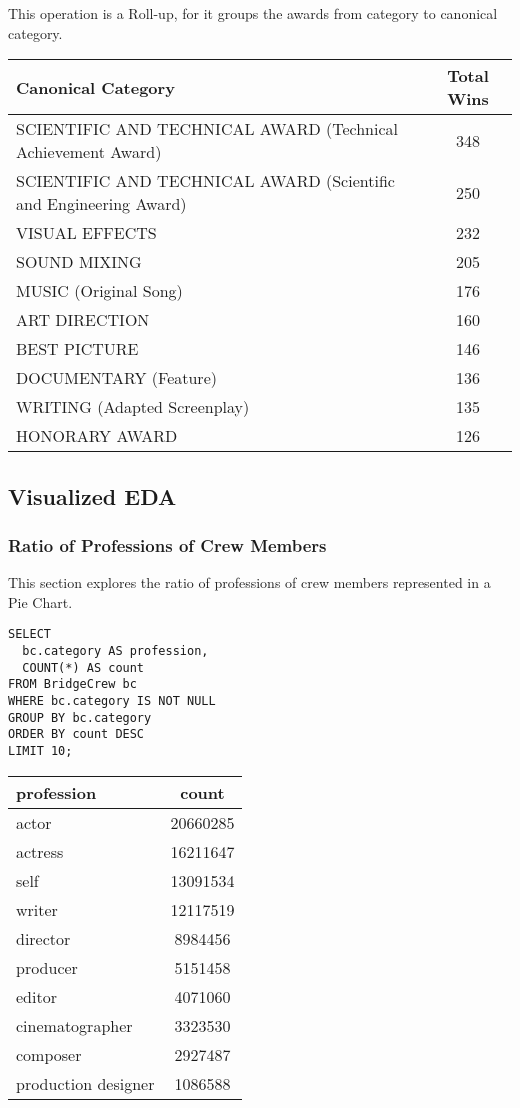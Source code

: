 \documentclass[sigconf, pbalance]{acmart}
\begin{document}
This operation is a Roll-up, for it groups the awards from category to canonical category.

\begin{center}
\begin{tabular}{|p{5cm}|c|}
\hline
\textbf{Canonical Category} & \textbf{Total Wins} \\
\hline
SCIENTIFIC AND TECHNICAL AWARD (Technical Achievement Award) & 348 \\
SCIENTIFIC AND TECHNICAL AWARD (Scientific and Engineering Award) & 250 \\
VISUAL EFFECTS & 232 \\
SOUND MIXING & 205 \\
MUSIC (Original Song) & 176 \\
ART DIRECTION & 160 \\
BEST PICTURE & 146 \\
DOCUMENTARY (Feature) & 136 \\
WRITING (Adapted Screenplay) & 135 \\
HONORARY AWARD & 126 \\
\hline
\end{tabular}
\end{center}

\subsection{Visualized EDA}

\subsubsection{Ratio of Professions of Crew Members}

This section explores the ratio of professions of crew members represented in a Pie Chart.
\newline
\begin{lstlisting}[style=SQLStyle]
SELECT 
  bc.category AS profession,
  COUNT(*) AS count
FROM BridgeCrew bc
WHERE bc.category IS NOT NULL
GROUP BY bc.category
ORDER BY count DESC
LIMIT 10;
\end{lstlisting}

\begin{center}
\begin{tabular}{|p{4cm}|c|}
\hline
profession & count\\
\hline
actor & 20660285 \\
actress & 16211647 \\
self & 13091534 \\ 
writer & 12117519 \\
director & 8984456 \\
producer & 5151458 \\
editor & 4071060 \\
cinematographer & 3323530 \\
composer & 2927487 \\
production designer & 1086588 \\
\hline
\end{tabular}
\end{center}
\end{document}
